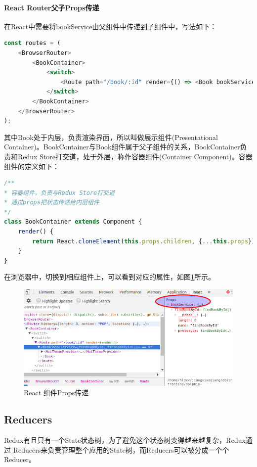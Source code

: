 \documentclass[letter]{book}
\begin{document}
\paragraph{React Router父子Props传递}

在React中需要将bookService由父组件中传递到子组件中，写法如下：

\begin{lstlisting}[language=Javascript]
const routes = (
	<BrowserRouter>
		<BookContainer>
			<switch>
				<Route path="/book/:id" render={() => <Book bookService={bookService}/>}/>
			</switch>
		</BookContainer>
	</BrowserRouter>
);
\end{lstlisting}

其中Book处于内层，负责渲染界面，所以叫做展示组件(Presentational Container)。BookContainer与Book组件属于父子组件的关系，BookContainer负责和Redux Store打交道，处于外层，称作容器组件(Container Component)。容器组件的定义如下：

\begin{lstlisting}[language=Javascript]
/**
* 容器组件，负责与Redux Store打交道
* 通过props把状态传递给内层组件
*/
class BookContainer extends Component {
	render() {
		return React.cloneElement(this.props.children, {...this.props});
	}
}
\end{lstlisting}

在浏览器中，切换到相应组件上，可以看到对应的属性，如图\ref{fig:bookserviceprops}所示。

\begin{figure}[htbp]
	\centering
	\includegraphics[scale=0.5]{bookserviceprops.png}
	\caption{React 组件Props传递}
	\label{fig:bookserviceprops}
\end{figure}


\subsection{Reducers}

Redux有且只有一个State状态树，为了避免这个状态树变得越来越复杂，Redux通过 Reducers来负责管理整个应用的State树，而Reducers可以被分成一个个Reducer。
\end{document}
